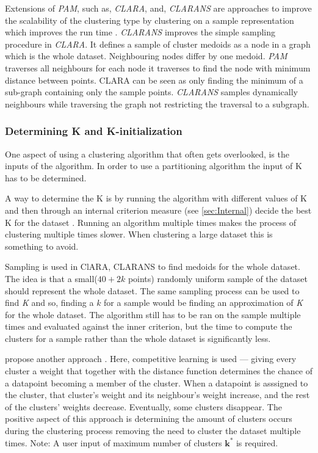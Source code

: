 \documentclass[../report.tex]{subfiles}
\begin{document}
Extensions of \textit{PAM}, such as, \textit{CLARA}, and, \textit{CLARANS} are approaches to improve the scalability of the clustering type by clustering on a sample representation which improves the run time \cite{Ng2002}. \textit{CLARANS} improves the simple sampling procedure in \textit{CLARA}. It defines a sample of cluster medoids as a node in a graph which is the whole dataset. Neighbouring nodes differ by one medoid. \textit{PAM} traverses all neighbours for each node it traverses to find the node with minimum distance between points. CLARA can be seen as only finding the minimum of a sub-graph containing only the sample points. \textit{CLARANS} samples dynamically neighbours while traversing the graph not restricting the traversal to a subgraph.

\subsubsection{Determining K and K-initialization}
One aspect of using a clustering algorithm that often gets overlooked, is the inputs of the algorithm.
In order to use a partitioning algorithm the input of K has to be determined.

A way to determine the K is by running the algorithm with different values of K and then through an internal criterion measure (see \ref{sec:Internal}) decide the best K for the dataset \cite{Huang97clusteringlarge, Sugar2003}. Running an algorithm multiple times makes the process of clustering multiple times slower. When clustering a large dataset this is something to avoid.

Sampling is used in ClARA, CLARANS \cite{Ng2002} to find medoids for the whole dataset. The idea is that a small($40 + 2k$ points) randomly uniform sample of the dataset should represent the whole dataset. The same sampling process can be used to find \textit{K} and so, finding a ${k}$ for a sample would be finding an approximation of \textit{K} for the whole dataset. The algorithm still has to be ran on the sample multiple times and evaluated against the inner criterion, but the time to compute the clusters for a sample rather than the whole dataset is significantly less.

\citeauthor{Cheung2013} propose another approach \cite{Cheung2013, Jia2018}. Here, competitive learning is used --- giving every cluster a weight that together with the distance function determines the chance of a datapoint becoming a member of the cluster. When a datapoint is asssigned to the cluster, that cluster's weight and its neighbour's weight increase, and the rest of the clusters' weights decrease. Eventually, some clusters disappear. The positive aspect of this approach is determining the amount of clusters occurs during the clustering process removing the need to cluster the dataset multiple times. Note: A user input of maximum number of clusters $\mathbf{k^*}$ is required.
\end{document}

